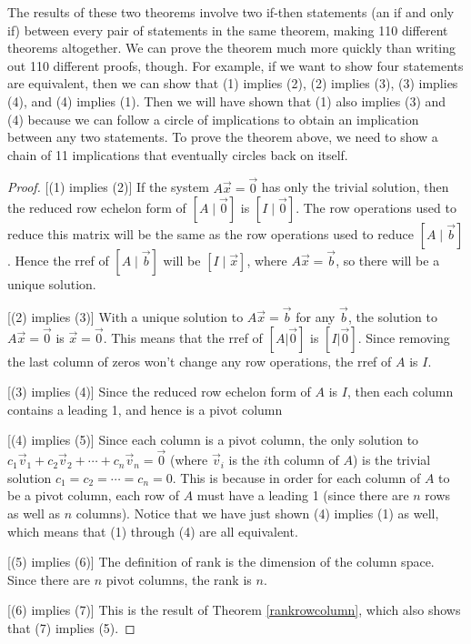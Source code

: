 The results of these two theorems involve two if-then statements (an if and only if) between every pair of statements in the same theorem, making 110 different theorems altogether. We can prove the theorem much more quickly than writing out 110 different proofs, though.  For example, if we want to show four statements are equivalent, then we can show that (1) implies (2), (2) implies (3), (3) implies (4), and (4) implies (1). Then we will have shown that (1) also implies (3) and (4) because we can follow a circle of implications to obtain an implication between any two statements.  To prove the theorem above, we need to show a chain of 11 implications that eventually circles back on itself.

\begin{proof}

[(1) implies (2)] If the system $A\vec x=\vec 0$ has only the trivial solution, then the reduced row echelon form of $[A\mid \vec 0]$ is $[I\mid \vec 0]$. The row operations used to reduce this matrix will be the same as the row operations used to reduce $[A\mid\vec b]$. Hence the rref of $[A\mid\vec b]$ will be $[I\mid \vec x]$, where $A\vec x=\vec b$, so there will be a unique solution.  

[(2) implies (3)]  With a unique solution to $A\vec x =\vec b$ for any $\vec b$, the solution to $A\vec x = \vec 0$ is $\vec x = \vec 0$.  This means that the rref of $[A|\vec 0]$ is $[I|\vec 0]$. Since removing the last column of zeros won't change any row operations, the rref of $A$ is $I$. 

[(3) implies (4)] Since the reduced row echelon form of $A$ is $I$, then each column contains a leading 1, and hence is a pivot column

[(4) implies (5)] Since each column is a pivot column, the only solution to $c_1 \vec v_1+c_2\vec v_2+\cdots+c_n\vec v_n=\vec 0$ (where $\vec v_i$ is the $i$th column of $A$) is the trivial solution $c_1=c_2=\cdots=c_n=0$. This is because in order for each column of $A$ to be a pivot column, each row of $A$ must have a leading 1 (since there are $n$ rows as well as $n$ columns).  Notice that we have just shown (4) implies (1) as well, which means that (1) through (4) are all equivalent.

[(5) implies (6)] The definition of rank is the dimension of the column space. Since there are $n$ pivot columns, the rank is $n$.

[(6) implies (7)] This is the result of Theorem \ref{rankrowcolumn}, which also shows that (7) implies (5).


\end{proof}
